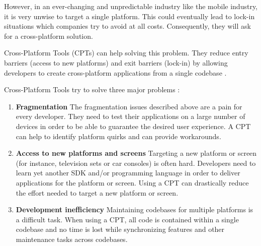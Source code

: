However, in an ever-changing and unpredictable industry like the mobile industry, it is very unwise to target a single platform. This could eventually lead to lock-in situations which companies try to avoid at all costs. Consequently, they will ask for a cross-platform solution. 

Cross-Platform Tools (CPTs) can help solving this problem. They reduce entry barriers (access to new platforms) and exit barriers (lock-in) by allowing developers to create cross-platform applications from a single codebase \cite{VMCPT:2012}. 

Cross-Platform Tools try to solve three major problems \cite{VMCPT:2012}: 

\begin{enumerate}
    \item \textbf{Fragmentation} The fragmentation issues described above are a pain for every developer. They need to test their applications on a large number of devices in order to be able to guarantee the desired user experience. A CPT can help to identify platform quirks and can provide workarounds. 
    \item \textbf{Access to new platforms and screens} Targeting a new platform or screen (for instance, television sets or car consoles) is often hard. Developers need to learn yet another SDK and/or programming language in order to deliver applications for the platform or screen. Using a CPT can drastically reduce the effort needed to target a new platform or screen.
    \item \textbf{Development inefficiency} Maintaining codebases for multiple platforms is a difficult task. When using a CPT, all code is contained within a single codebase and no time is lost while synchronizing features and other maintenance tasks across codebases. 
\end{enumerate}



